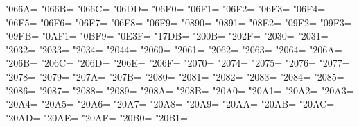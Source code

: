 \XeTeXcharclass"066A=\KclassNum
\XeTeXcharclass"066B=\KclassNum
\XeTeXcharclass"066C=\KclassNum
\XeTeXcharclass"06DD=\KclassNum
\XeTeXcharclass"06F0=\KclassNum
\XeTeXcharclass"06F1=\KclassNum
\XeTeXcharclass"06F2=\KclassNum
\XeTeXcharclass"06F3=\KclassNum
\XeTeXcharclass"06F4=\KclassNum
\XeTeXcharclass"06F5=\KclassNum
\XeTeXcharclass"06F6=\KclassNum
\XeTeXcharclass"06F7=\KclassNum
\XeTeXcharclass"06F8=\KclassNum
\XeTeXcharclass"06F9=\KclassNum
\XeTeXcharclass"0890=\KclassNum
\XeTeXcharclass"0891=\KclassNum
\XeTeXcharclass"08E2=\KclassNum
\XeTeXcharclass"09F2=\KclassNum
\XeTeXcharclass"09F3=\KclassNum
\XeTeXcharclass"09FB=\KclassNum
\XeTeXcharclass"0AF1=\KclassNum
\XeTeXcharclass"0BF9=\KclassNum
\XeTeXcharclass"0E3F=\KclassNum
\XeTeXcharclass"17DB=\KclassNum
\XeTeXcharclass"200B=\KclassNum
\XeTeXcharclass"202F=\KclassNum
\XeTeXcharclass"2030=\KclassNum
\XeTeXcharclass"2031=\KclassNum
\XeTeXcharclass"2032=\KclassNum
\XeTeXcharclass"2033=\KclassNum
\XeTeXcharclass"2034=\KclassNum
\XeTeXcharclass"2044=\KclassNum
\XeTeXcharclass"2060=\KclassNum
\XeTeXcharclass"2061=\KclassNum
\XeTeXcharclass"2062=\KclassNum
\XeTeXcharclass"2063=\KclassNum
\XeTeXcharclass"2064=\KclassNum
\XeTeXcharclass"206A=\KclassNum
\XeTeXcharclass"206B=\KclassNum
\XeTeXcharclass"206C=\KclassNum
\XeTeXcharclass"206D=\KclassNum
\XeTeXcharclass"206E=\KclassNum
\XeTeXcharclass"206F=\KclassNum
\XeTeXcharclass"2070=\KclassNum
\XeTeXcharclass"2074=\KclassNum
\XeTeXcharclass"2075=\KclassNum
\XeTeXcharclass"2076=\KclassNum
\XeTeXcharclass"2077=\KclassNum
\XeTeXcharclass"2078=\KclassNum
\XeTeXcharclass"2079=\KclassNum
\XeTeXcharclass"207A=\KclassNum
\XeTeXcharclass"207B=\KclassNum
\XeTeXcharclass"2080=\KclassNum
\XeTeXcharclass"2081=\KclassNum
\XeTeXcharclass"2082=\KclassNum
\XeTeXcharclass"2083=\KclassNum
\XeTeXcharclass"2084=\KclassNum
\XeTeXcharclass"2085=\KclassNum
\XeTeXcharclass"2086=\KclassNum
\XeTeXcharclass"2087=\KclassNum
\XeTeXcharclass"2088=\KclassNum
\XeTeXcharclass"2089=\KclassNum
\XeTeXcharclass"208A=\KclassNum
\XeTeXcharclass"208B=\KclassNum
\XeTeXcharclass"20A0=\KclassNum
\XeTeXcharclass"20A1=\KclassNum
\XeTeXcharclass"20A2=\KclassNum
\XeTeXcharclass"20A3=\KclassNum
\XeTeXcharclass"20A4=\KclassNum
\XeTeXcharclass"20A5=\KclassNum
\XeTeXcharclass"20A6=\KclassNum
\XeTeXcharclass"20A7=\KclassNum
\XeTeXcharclass"20A8=\KclassNum
\XeTeXcharclass"20A9=\KclassNum
\XeTeXcharclass"20AA=\KclassNum
\XeTeXcharclass"20AB=\KclassNum
\XeTeXcharclass"20AC=\KclassNum
\XeTeXcharclass"20AD=\KclassNum
\XeTeXcharclass"20AE=\KclassNum
\XeTeXcharclass"20AF=\KclassNum
\XeTeXcharclass"20B0=\KclassNum
\XeTeXcharclass"20B1=\KclassNum
